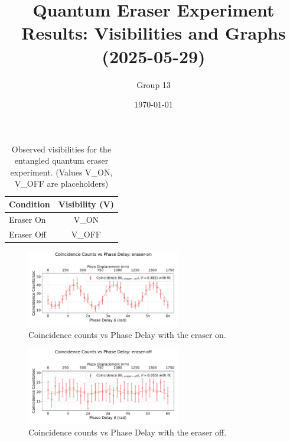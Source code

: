 \documentclass{article}
\title{Quantum Eraser Experiment Results: Visibilities and Graphs (2025-05-29)}
\author{Group 13} %
\date{\today}
\begin{document}
\pagestyle{empty} %

\begin{table}[h!]
\centering
\begin{tabular}{lc}
\toprule
\textbf{Condition} & \textbf{Visibility (V)} \\
\midrule
Eraser On   & V\_ON  \\ %
Eraser Off  & V\_OFF \\ %
\bottomrule
\end{tabular}
\caption{Observed visibilities for the entangled quantum eraser experiment. (Values V\_ON, V\_OFF are placeholders)}
\end{table}


\begin{figure}[h!]
\centering
\includegraphics[width=0.6\textwidth]{coincidence_counts_eraser_on.pdf}
\caption{Coincidence counts vs Phase Delay with the eraser on.}
\end{figure}


\begin{figure}[h!]
\centering
\includegraphics[width=0.6\textwidth]{coincidence_counts_eraser_off.pdf}
\caption{Coincidence counts vs Phase Delay with the eraser off.}
\end{figure}
\end{document}
